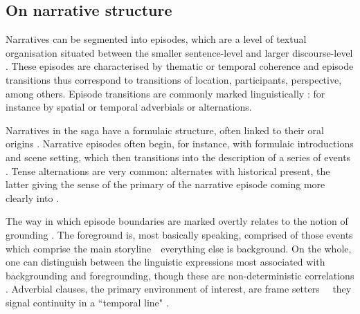 \documentclass[output=paper,colorlinks,citecolor=brown]{langscibook}
\begin{document}
\subsection{On narrative structure}\label{sec:Chark3.2}

Narratives can be segmented into episodes, which are a level of textual organisation situated between the smaller sentence-level and larger discourse-level \citep{van1976philosophy, enkvist1987old, Fleischman1990}. These episodes are characterised by thematic or temporal coherence and episode transitions thus correspond to transitions of location, participants, perspective, among others. Episode transitions are commonly marked linguistically \citep{Brinton1996, warvik1995a}: for instance by spatial or temporal adverbials or  alternations.

Narratives in the saga  have a formulaic structure, often linked to their oral origins \citep{hauksson1994islensk}. Narrative episodes often begin, for instance, with formulaic introductions and scene setting, which then transitions into the description of a series of events \citep{clover1974scene}. Tense alternations are very common:  alternates with historical present, the latter giving the sense of the primary  of the narrative episode coming more clearly into  \citep{Fleischman1985}. 



The way in which episode boundaries are marked overtly relates to the notion of grounding \citep{hopper1979some}. The foreground is, most basically speaking, comprised of those events which comprise the main storyline\ \textendash{}\  everything else is background. On the whole, one can distinguish between the linguistic expressions most associated with backgrounding and foregrounding, though these are non-deterministic correlations \citep[49]{Brinton1996}. Adverbial clauses, the primary environment of interest, are frame setters \citep{talmy1978figure}\ \textendash{}\  they signal continuity in a ``temporal line" \citep{Fleischman1985}. 
\end{document}
